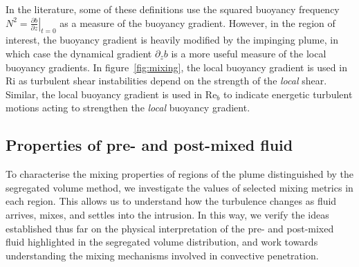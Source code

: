 \documentclass[a4paper]{article}
\begin{document}
In the literature, some of these definitions use the squared buoyancy frequency $N^2 = \left.\frac{\partial
b}{\partial z}\right|_{t=0}$ as a measure of the buoyancy gradient. However, in the region of interest,
the buoyancy gradient is heavily modified by the impinging plume, in which case the dynamical gradient
$\partial_z b$ is a more useful measure of the local buoyancy gradients. In figure~\ref{fig:mixing}, the
local buoyancy gradient is used in $\mathrm{Ri}$ as turbulent shear instabilities depend on the strength of
the \emph{local} shear. Similar, the local buoyancy gradient is used in $\mathrm{Re}_b$ to indicate energetic
turbulent motions acting to strengthen the \emph{local} buoyancy gradient. 

\subsection{Properties of pre- and post-mixed fluid}
To characterise the mixing properties of regions of the plume distinguished by the segregated volume method,
we investigate the values of selected mixing metrics in each region. This allows us to understand how the
turbulence changes as fluid arrives, mixes, and settles into the intrusion. In this way, we verify the ideas
established thus far on the physical interpretation of the pre- and post-mixed fluid highlighted in the
segregated volume distribution, and work towards understanding the mixing mechanisms involved in convective
penetration.
\end{document}
